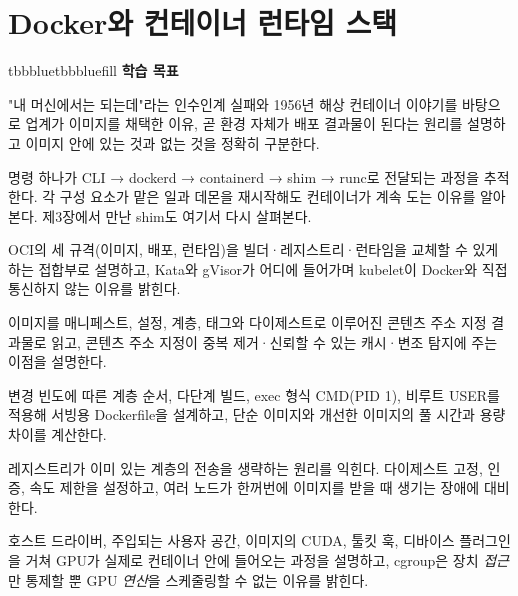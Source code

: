 \setcounter{chapter}{3}
\chapter{Docker와 컨테이너 런타임 스택}

\begin{calloutbox}{tbbblue}{tbbbluefill}
{\normalsize\bfseries\color{tbbblue}학습 목표}\par\vspace{3pt}
\begin{tbbitemize}
  \item "내 머신에서는 되는데"라는 인수인계 실패와 1956년 해상 컨테이너 이야기를 바탕으로 업계가 이미지를 채택한 이유, 곧 환경 자체가 배포 결과물이 된다는 원리를 설명하고 이미지 안에 있는 것과 없는 것을 정확히 구분한다.
  \item {} 명령 하나가 CLI → dockerd → containerd → shim → runc로 전달되는 과정을 추적한다. 각 구성 요소가 맡은 일과 데몬을 재시작해도 컨테이너가 계속 도는 이유를 알아본다. 제3장에서 만난 shim도 여기서 다시 살펴본다.
  \item OCI의 세 규격(이미지, 배포, 런타임)을 빌더·레지스트리·런타임을 교체할 수 있게 하는 접합부로 설명하고, Kata와 gVisor가 어디에 들어가며 kubelet이 Docker와 직접 통신하지 않는 이유를 밝힌다.
  \item 이미지를 매니페스트, 설정, 계층, 태그와 다이제스트로 이루어진 콘텐츠 주소 지정 결과물로 읽고, 콘텐츠 주소 지정이 중복 제거·신뢰할 수 있는 캐시·변조 탐지에 주는 이점을 설명한다.
  \item 변경 빈도에 따른 계층 순서, 다단계 빌드, exec 형식 CMD(PID 1), 비루트 USER를 적용해 서빙용 Dockerfile을 설계하고, 단순 이미지와 개선한 이미지의 풀 시간과 용량 차이를 계산한다.
  \item 레지스트리가 이미 있는 계층의 전송을 생략하는 원리를 익힌다. 다이제스트 고정, 인증, 속도 제한을 설정하고, 여러 노드가 한꺼번에 이미지를 받을 때 생기는 장애에 대비한다.
  \item 호스트 드라이버, 주입되는 사용자 공간, 이미지의 CUDA, 툴킷 훅, 디바이스 플러그인을 거쳐 GPU가 실제로 컨테이너 안에 들어오는 과정을 설명하고, cgroup은 장치 \textit{접근}만 통제할 뿐 GPU \textit{연산}을 스케줄링할 수 없는 이유를 밝힌다.
\end{tbbitemize}
\end{calloutbox}

\vspace{5.0pt}

